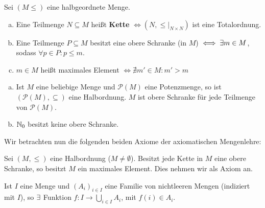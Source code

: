 \documentclass[a4paper]{report}
\begin{document}
 \begin{defi}
   Sei $(M \le)$ eine halbgeordnete Menge.
   \begin{enumerate}[(a)]
     \item Eine Teilmenge $N \subseteq M$ heißt \textbf{Kette} $\iff (N, \le|_{N \times N})$ ist eine Totalordnung.
     \item Eine Teilmenge $P \subseteq M$ besitzt eine obere Schranke (in $M$) $\iff \exists m \in M$, sodass $\forall p \in P : p \le m$.
     \item $m \in M$ heißt maximales Element $\iff \nexists m' \in M : m' > m$
   \end{enumerate}
 \end{defi}
 \begin{bsp*}
\begin{enumerate}[(a)]
  \item Ist $M$ eine beliebige Menge und $\mathcal P(M)$ eine Potenzmenge, so ist $(\mathcal P(M), \subseteq)$ eine Halbordnung. $M$ ist obere Schranke für jede Teilmenge von $\mathcal P(M)$.
  \item $\mathbb{N}_0$ besitzt keine obere Schranke.
\end{enumerate}
 \end{bsp*}
 Wir betrachten nun die folgenden beiden Axiome der axiomatischen Mengenlehre:
\begin{axiom*}
  Sei $(M, \le)$ eine Halbordnung ($M \ne \emptyset$). Besitzt jede Kette in $M$ eine obere Schranke, so besitzt $M$ ein maximales Element.
  Dies nehmen wir als Axiom an.
\end{axiom*}
\begin{axiom*}[Auswahlaxiom]
  Ist $I$ eine Menge und $(A_{i})_{i \in I}$ eine Familie von nichtleeren Mengen (indiziert mit $I$), so $\exists$ Funktion $f: I \to \bigcup_{i \in I}A_{i}$, mit $f(i) \in A_{i}$.
\end{axiom*}
\end{document}

